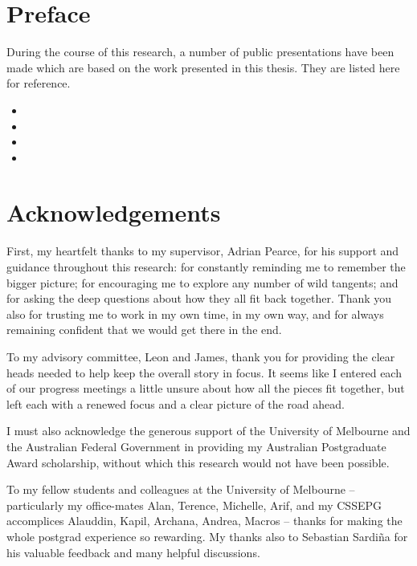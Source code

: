 \chapter*{Preface}
During the course of this research, a number of public presentations have been
 made which are based on the work presented in this thesis. They are listed
 here for reference.

\nobibliography*
\begin{itemize}
\item {}
\item {}
\item {}
\item {}
\end{itemize}


\chapter*{Acknowledgements} 

First, my heartfelt thanks to my supervisor, Adrian Pearce, for his support
and guidance throughout this research: for constantly reminding me to remember
the bigger picture; for encouraging me to explore any number of wild tangents; 
and for asking the deep questions about how they all fit back together.
Thank you also for trusting me to work in my own time, in my own way, and for
always remaining confident that we would get there in the end.

To my advisory committee, Leon and James, thank you for providing the
clear heads needed to help keep the overall story in focus.  It seems like I
entered each of our progress meetings a little unsure about how all the pieces fit together, but left each with a renewed focus and a clear picture of the road ahead.

I must also acknowledge the generous support of the University of Melbourne
and the Australian Federal Government in providing my Australian Postgraduate
Award scholarship, without which this research would not have been possible.

To my fellow students and colleagues at the University of Melbourne -- particularly my office-mates Alan, Terence, Michelle, Arif, and my CSSEPG accomplices Alauddin, Kapil, Archana, Andrea, Macros -- thanks for making the whole postgrad
experience so rewarding. My thanks also to Sebastian Sardi\~na for his valuable feedback and many helpful discussions.

